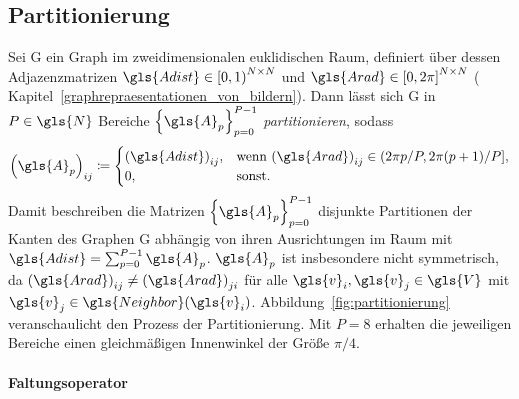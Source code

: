 \subsection{Partitionierung}
\label{partitionierung}



Sei \gls{G} ein Graph im zweidimensionalen euklidischen Raum, definiert über dessen Adjazenzmatrizen $\gls{Adist} \in {\left[0, 1\right)}^{N \times N}$ und $\gls{Arad} \in {\left[0, 2\pi\right]}^{N \times N}$ (\vgl{} Kapitel~\ref{graphrepraesentationen_von_bildern}).
Dann lässt sich \gls{G} in $P \in \gls{N}$ Bereiche ${\left\{\gls{A}_p\right\}}_{p=0}^{P-1}$ \emph{partitionieren}, sodass
\begin{equation*}
  {\left(\gls{A}_p\right)}_{ij} \coloneqq \begin{cases}
    {\left(\gls{Adist}\right)}_{ij}, & \text{wenn } {\left(\gls{Arad}\right)}_{ij} \in \left(2\pi p/P, 2\pi\left(p+1\right)/P\right],\\
    0, & \text{sonst.}
  \end{cases}
\end{equation*}
Damit beschreiben die Matrizen ${\left\{\gls{A}_p\right\}}_{p=0}^{P-1}$ disjunkte Partitionen der Kanten des Graphen \gls{G} abhängig von ihren Ausrichtungen im Raum mit $\gls{Adist} = \sum_{p=0}^{P-1} \gls{A}_p$.
$\gls{A}_p$ ist insbesondere nicht symmetrisch, da ${\left(\gls{Arad}\right)}_{ij} \neq {\left(\gls{Arad}\right)}_{ji}$ für alle $\gls{v}_i, \gls{v}_j \in \gls{V}$ mit $\gls{v}_j \in \gls{Neighbor}\left(\gls{v}_i\right)$.
Abbildung~\ref{fig:partitionierung} veranschaulicht den Prozess der Partitionierung.
Mit $P = 8$ erhalten die jeweiligen Bereiche \zB{} einen gleichmäßigen Innenwinkel der Größe $\pi/4$.

\paragraph{Faltungsoperator}
\label{partitionierung_faltungsoperator}

